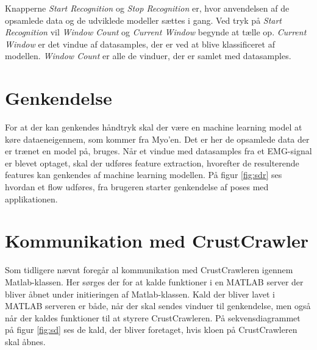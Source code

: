 Knapperne \textit{Start Recognition} og \textit{Stop Recognition} er, hvor anvendelsen af de opsamlede data og de udviklede modeller sættes i gang. Ved tryk på \textit{Start Recognition} vil \textit{Window Count} og \textit{Current Window} begynde at tælle op. \textit{Current Window} er det vindue af datasamples, der er ved at blive klassificeret af modellen. \textit{Window Count} er alle de vinduer, der er samlet med datasamples.

\section{Genkendelse}
For at der kan genkendes håndtryk skal der være en machine learning model at køre dataeneigennem, som kommer fra Myo'en. Det er her de opsamlede data der er trænet en model på, bruges. Når et vindue med datasamples fra et EMG-signal er blevet optaget, skal der udføres feature extraction, hvorefter de resulterende features kan genkendes af machine learning modellen. På figur \ref{fig:sdr} ses hvordan et flow udføres, fra brugeren starter genkendelse af poses med applikationen.



\section{Kommunikation med CrustCrawler}
\label{sec:ktc}
Som tidligere nævnt foregår al kommunikation med CrustCrawleren igennem Matlab-klassen. Her sørges der for at kalde funktioner i en MATLAB server der bliver åbnet under initieringen af Matlab-klassen. Kald der bliver lavet i MATLAB serveren er både, når der skal sendes vinduer til genkendelse, men også når der kaldes funktioner til at styrere CrustCrawleren. På sekvensdiagrammet på figur \ref{fig:sd} ses de kald, der bliver foretaget, hvis kloen på CrustCrawleren skal åbnes.

